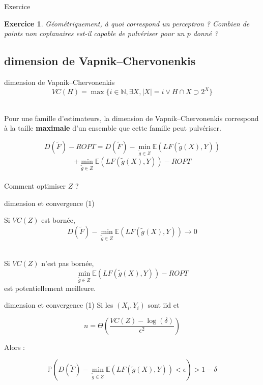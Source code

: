 \documentclass[11pt]{beamer}
\newtheorem{exercice}{Exercice}
\begin{document}
\begin{frame}{Exercice}

\begin{exercice}
Géométriquement, à quoi correspond un perceptron ? Combien de points non coplanaires est-il capable de pulvériser pour un $p$ donné ?
\end{exercice}

\end{frame}

\subsection{dimension de Vapnik–Chervonenkis}

\begin{frame}{dimension de Vapnik–Chervonenkis}
$$VC(H) = \max \{i\in \mathbb{N}, \exists X, |X|=i \vee H \cap X \supset 2^X \}$$
\\ \vspace{0.2cm}

Pour une famille d'estimateurs, la dimension de Vapnik–Chervonenkis correspond à la taille \textbf{maximale} d'un ensemble que cette famille peut pulvériser.

\end{frame}

\begin{frame}{}
$$D(\tilde{F}) - ROPT = D(\tilde{F}) - \min_{\tilde{g}\in Z}\mathbb{E}(LF(\tilde{g}(X),Y))$$
$$+\min_{\tilde{g}\in Z}\mathbb{E}(LF(\tilde{g}(X),Y)) - ROPT $$
\\ \vspace{0.3cm}
Comment optimiser $Z$ ?
\end{frame}

\begin{frame}{dimension et convergence (1)}

Si $VC(Z)$ est bornée, $$D(\tilde{F}) - \min_{\tilde{g}\in Z} \mathbb{E}(LF(\tilde{g}(X),Y))\longrightarrow 0$$\\

\pause
\vspace{0.2cm}

Si $VC(Z)$ n'est pas bornée, $$\min_{\tilde{g}\in Z}\mathbb{E}(LF(\tilde{g}(X),Y))- ROPT$$ est potentiellement meilleure.

\end{frame}

\begin{frame}{dimension et convergence (1)}
Si les $(X_i,Y_i) $ sont iid et

$$ n = \Theta\left(\frac{VC(Z)-\log(\delta)}{\epsilon^2}\right)$$

Alors :

$$ \mathbb{P}\left(D(\tilde{F}) - \min_{\tilde{g}\in Z}\mathbb{E}(LF(\tilde{g}(X),Y))<\epsilon\right) >1-\delta$$
\end{frame}
\end{document}
